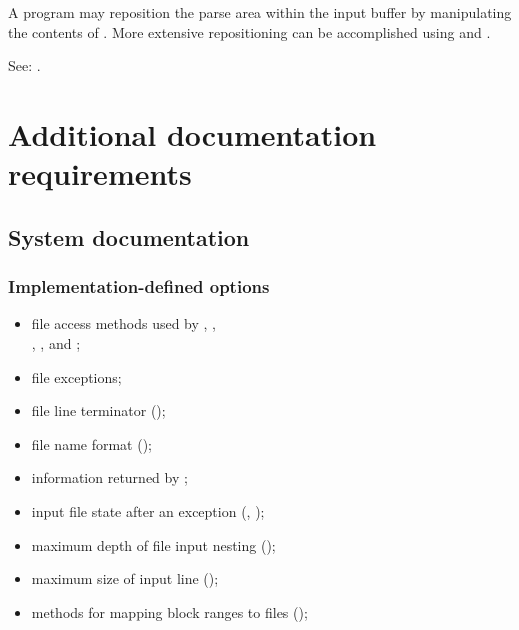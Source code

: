 A program may reposition the parse area within the input buffer by
manipulating the contents of . More extensive
repositioning can be accomplished using  and
.

See: .

\section{Additional documentation requirements} %

\subsection{System documentation} %

\subsubsection{Implementation-defined options} %
\label{file:impopt}

\begin{itemize}
\item file access methods used by
	,
	, \\
	,
	,
	 and
	;
\item file exceptions;
\item file line terminator ();
\item file name format ();
\item information returned by ;
\item input file state after an exception
	(,
	 );
\item maximum depth of file input nesting
	();
\item maximum size of input line ();
\item methods for mapping block ranges to files
	();
\end{itemize}

